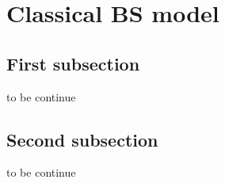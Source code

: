 
\section[Note 1  -- {Classical BS model}]{Classical BS model}
\subsection{First subsection}

to be continue

\subsection{Second subsection}

to be continue